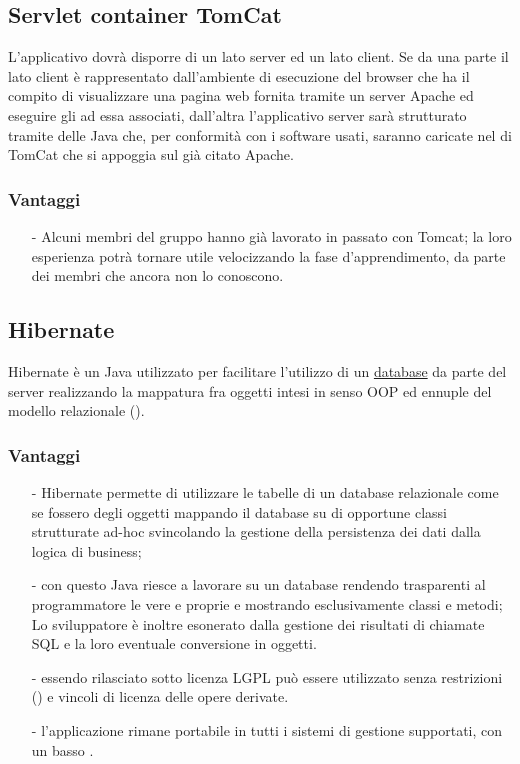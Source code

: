 \subsection{Servlet container TomCat}

L'applicativo dovrà disporre di un lato server ed un lato client. Se da una parte il lato client è rappresentato dall'ambiente di esecuzione del browser che ha il compito di visualizzare una pagina web fornita tramite un server Apache ed eseguire gli  ad essa associati, dall'altra l'applicativo server sarà strutturato tramite delle  Java che, per conformità con i software usati, saranno caricate nel  di TomCat che si appoggia sul già citato Apache.

\subsubsection*{Vantaggi}

\begin{itemize}[noitemsep,nolistsep]
  \item[-] Alcuni membri del gruppo hanno già lavorato in passato con Tomcat; la loro esperienza potrà tornare utile velocizzando la fase d'apprendimento, da parte dei membri che ancora non lo conoscono.
\end{itemize}

\subsection{Hibernate}\label{sec:hibernate}

Hibernate è un  Java utilizzato per facilitare l'utilizzo di un \underline{database} da parte del server realizzando la mappatura fra oggetti intesi in senso OOP ed ennuple del modello relazionale ().

\subsubsection*{Vantaggi}
\begin{itemize}[noitemsep,nolistsep]
\item[-] Hibernate permette di utilizzare le tabelle di un database relazionale come se fossero degli oggetti mappando il database su di opportune classi strutturate ad-hoc svincolando la gestione della persistenza dei dati dalla logica di business;
\item[-] con questo  Java riesce a lavorare su un database rendendo trasparenti al programmatore le vere e proprie  e mostrando esclusivamente classi e metodi; Lo sviluppatore è inoltre esonerato dalla gestione dei risultati di chiamate SQL e la loro eventuale conversione in oggetti.
\item[-] essendo rilasciato sotto licenza LGPL può essere utilizzato senza restrizioni () e vincoli di licenza delle opere derivate.
\item[-] l'applicazione rimane portabile in tutti i sistemi di gestione supportati, con un basso .
\end{itemize}
\clearpage

